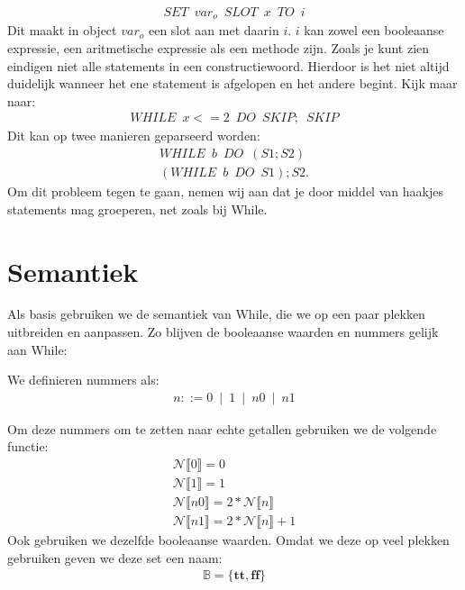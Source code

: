 \documentclass[12pt]{article}
\begin{document}
\begin{align*}
	 SET \enspace var_o\enspace SLOT\enspace x\enspace TO\enspace i
\end{align*} 
Dit maakt in object $var_o$ een slot aan met daarin $i$. $i$ kan zowel een booleaanse expressie, een aritmetische expressie als een methode zijn. 
Zoals je kunt zien eindigen niet alle statements in een constructiewoord. Hierdoor is het niet altijd duidelijk wanneer het ene statement is afgelopen en het andere begint. Kijk maar naar:
\begin{align*}
WHILE \enspace x <= 2 \enspace DO \enspace SKIP; \enspace SKIP
\end{align*}
Dit kan op twee manieren geparseerd worden:
\begin{gather*}
WHILE\enspace b\enspace DO\enspace (S1;S2) \\
(WHILE\enspace b\enspace DO\enspace S1); S2. 
\end{gather*} 
Om dit probleem tegen te gaan, nemen wij aan dat je door middel van haakjes statements mag groeperen, net zoals bij While.
\pagebreak

\section{Semantiek}

Als basis gebruiken we de semantiek van While, die we op een paar plekken uitbreiden en aanpassen.
Zo blijven de booleaanse waarden en nummers gelijk aan While:

We definieren nummers als:
\begin{align*}
n ::= 0 \enspace|\enspace 1 \enspace|\enspace n0 \enspace|\enspace n1
\end{align*}

Om deze nummers om te zetten naar echte getallen gebruiken we de volgende functie:
\begin{gather*} 
\mathcal{N}\llbracket 0 \rrbracket = 0  \\
\mathcal{N}\llbracket 1 \rrbracket = 1 \\
\mathcal{N}\llbracket n0 \rrbracket = 2 * \mathcal{N}\llbracket n \rrbracket \\
\mathcal{N}\llbracket n1 \rrbracket = 2 * \mathcal{N}\llbracket n \rrbracket + 1 
\end{gather*}
Ook gebruiken we dezelfde booleaanse waarden. Omdat we deze op veel plekken gebruiken geven we deze set een naam:
\begin{align*}
\mathds{B} = \{\boldsymbol{tt},\boldsymbol{ff}\}
\end{align*}
\end{document}
